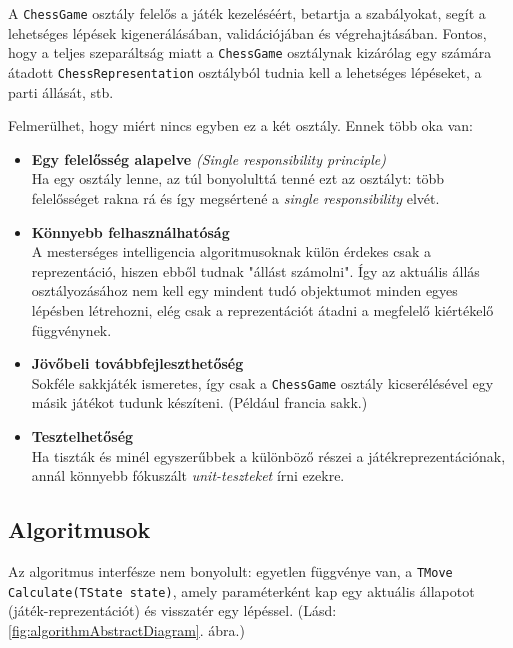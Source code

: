 \documentclass[twoside, a4paper, 12pt]{article}
\begin{document}
A \texttt{ChessGame} osztály felelős a játék kezeléséért, betartja a szabályokat, segít a lehetséges lépések kigenerálásában, validációjában és végrehajtásában. Fontos, hogy a teljes szeparáltság miatt a \texttt{ChessGame} osztálynak kizárólag egy számára átadott \texttt{ChessRepresentation} osztályból tudnia kell a lehetséges lépéseket, a parti állását, stb.

Felmerülhet, hogy miért nincs egyben ez a két osztály. Ennek több oka van:

\begin{itemize}
	\item \textbf{Egy felelősség alapelve} \textit{(Single responsibility principle)}\cite{SingleResponsibilityHu}~\cite{SingleResponsibilityEn}~\cite{SOLID}~ \\
	Ha egy osztály lenne, az túl bonyolulttá tenné ezt az osztályt: több felelősséget rakna rá és így megsértené a \textit{single responsibility} elvét.
	
	\item \textbf{Könnyebb felhasználhatóság} \\
	A mesterséges intelligencia algoritmusoknak külön érdekes csak a reprezentáció, hiszen ebből tudnak "állást számolni". Így az aktuális állás osztályozásához nem kell egy mindent tudó objektumot minden egyes lépésben létrehozni, elég csak a reprezentációt átadni a megfelelő kiértékelő függvénynek.
	
	\item \textbf{Jövőbeli továbbfejleszthetőség} \\
	Sokféle sakkjáték ismeretes, így csak a \texttt{ChessGame} osztály kicserélésével egy másik játékot tudunk készíteni. (Például francia sakk.)
	
	\item \textbf{Tesztelhetőség} \\
	Ha tiszták és minél egyszerűbbek a különböző részei a játékreprezentációnak, annál könnyebb fókuszált \textit{unit-teszteket} írni ezekre.
\end{itemize}

\subsection{Algoritmusok}
Az algoritmus interfésze nem bonyolult: egyetlen függvénye van, a \texttt{TMove Calculate(TState state)}, amely paraméterként kap egy aktuális állapotot (játék-reprezentációt) és visszatér egy lépéssel. (Lásd: \ref{fig:algorithmAbstractDiagram}. ábra.)
\end{document}
